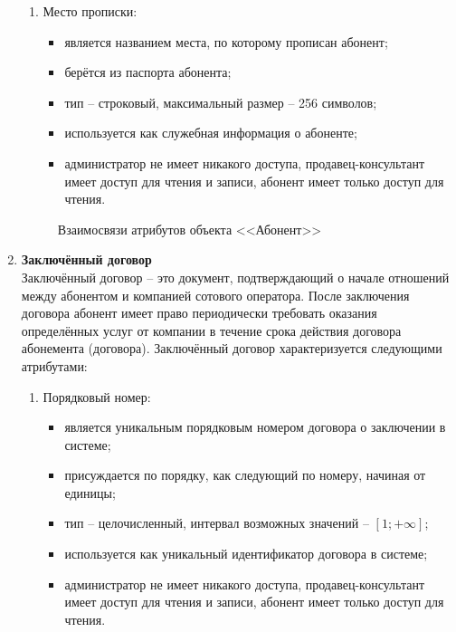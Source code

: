 \begin{enumerate}
\begin{enumerate}
        \item Место прописки:
        \begin{itemize}
            \item является названием места, по которому прописан абонент;
            \item берётся из паспорта абонента;
            \item тип -- строковый, максимальный размер -- 256 символов;
            \item используется как служебная информация о абоненте;
            \item администратор не имеет никакого доступа, продавец-консультант имеет доступ для чтения и записи, абонент имеет только доступ для чтения.
        \end{itemize}
    \end{enumerate}
    \begin{figure}[H]
        \label{fig:subscriber-attributes}
        \caption{Взаимосвязи атрибутов объекта <<Абонент>>}
    \end{figure}

    \item \textbf{Заключённый договор} \\
    Заключённый договор -- это документ, подтверждающий о начале отношений между абонентом и компанией сотового оператора. После заключения договора абонент имеет право периодически требовать оказания определённых услуг от компании в течение срока действия договора абонемента (договора). Заключённый договор характеризуется следующими атрибутами:
    \begin{enumerate}
        \item Порядковый номер:
        \begin{itemize}
            \item является уникальным порядковым номером договора о заключении в системе;
            \item присуждается по порядку, как следующий по номеру, начиная от единицы;
            \item тип -- целочисленный, интервал возможных значений -- $[1; +\infty]$;
            \item используется как уникальный идентификатор договора в системе;
            \item администратор не имеет никакого доступа, продавец-консультант имеет доступ для чтения и записи, абонент имеет только доступ для чтения.
        \end{itemize}


\end{enumerate}
\end{enumerate}
